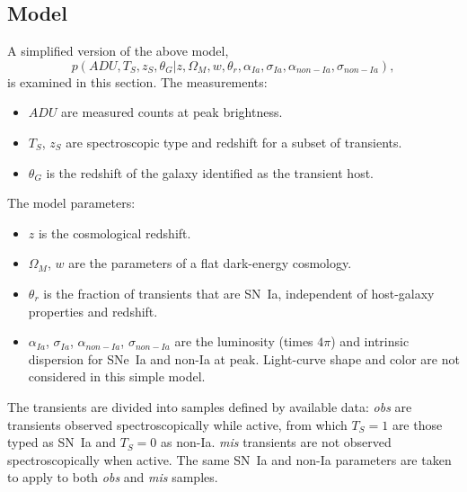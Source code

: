 \documentclass[preprint]{aastex}
\begin{document}
\subsection{Model}
\label{example:sec}
A simplified version of the above model,
\begin{equation}
p(\mathit{ADU}, {{T}}_S,{{z}}_S, \theta_G| z, \Omega_M, w, \theta_r,\alpha_{Ia},\sigma_{Ia}, \alpha_{\mathit{non-Ia}},\sigma_{\mathit{non-Ia}}),
\end{equation}
is examined in this section.
The measurements: 
\begin{itemize}
\item $\mathit{ADU}$ are measured counts at peak brightness.
\item ${{T}}_S$, ${{z}}_S$ are spectroscopic type and redshift for a subset of transients.
\item $\theta_G$ is the redshift of the galaxy identified as the transient host.
\end{itemize}
The model parameters:
\begin{itemize}
\item $z$ is the cosmological redshift.
\item $\Omega_M$, $w$ are the parameters of a flat dark-energy cosmology.
\item $\theta_r$ is the fraction of transients that are SN~Ia, independent
of host-galaxy properties and redshift.
\item $\alpha_{Ia}$, $\sigma_{Ia}$, $\alpha_{\mathit{non-Ia}}$, $\sigma_{\mathit{non-Ia}}$ are
the luminosity (times $4\pi$) and intrinsic dispersion for SNe~Ia and non-Ia at peak.
Light-curve shape and color are not considered in this simple model.
\end{itemize}

The transients are divided into samples defined by available data: {\it obs} are transients observed spectroscopically while active, from which $T_S=1$ are those typed
as SN~Ia and $T_S=0$ as non-Ia.  {\it mis} transients are not observed
spectroscopically when active.  The same SN~Ia and non-Ia parameters are taken to
apply to both {\it obs} and {\it mis} samples.
\end{document}
